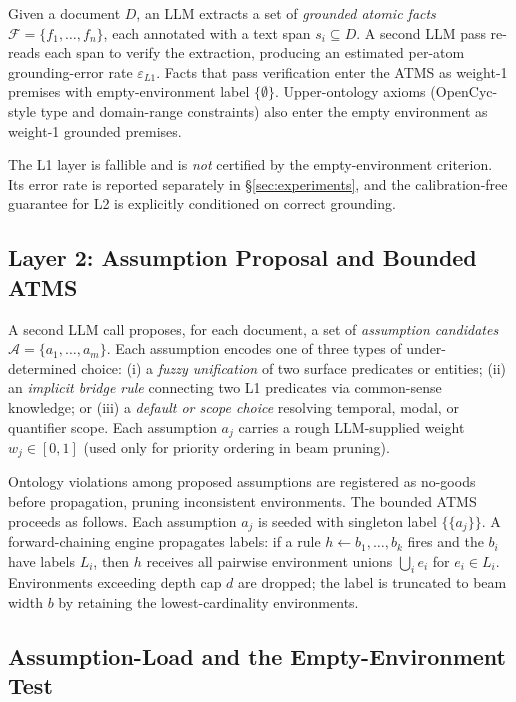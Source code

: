 \documentclass[11pt,letterpaper]{article}
\begin{document}
Given a document $D$, an LLM extracts a set of \emph{grounded atomic facts} $\mathcal{F} = \{f_1,
\ldots, f_n\}$, each annotated with a text span $s_i \subseteq D$. A second LLM pass re-reads each
span to verify the extraction, producing an estimated per-atom grounding-error rate $\varepsilon_{L1}$.
Facts that pass verification enter the ATMS as weight-1 premises with empty-environment label
$\{\emptyset\}$. Upper-ontology axioms (OpenCyc-style type and domain-range constraints) also enter the
empty environment as weight-1 grounded premises.

The L1 layer is fallible and is \emph{not} certified by the empty-environment criterion. Its error rate
is reported separately in \S\ref{sec:experiments}, and the calibration-free guarantee for L2 is
explicitly conditioned on correct grounding.

\subsection{Layer 2: Assumption Proposal and Bounded ATMS}

A second LLM call proposes, for each document, a set of \emph{assumption candidates} $\mathcal{A} =
\{a_1, \ldots, a_m\}$. Each assumption encodes one of three types of under-determined choice: (i) a
\emph{fuzzy unification} of two surface predicates or entities; (ii) an \emph{implicit bridge rule}
connecting two L1 predicates via common-sense knowledge; or (iii) a \emph{default or scope choice}
resolving temporal, modal, or quantifier scope. Each assumption $a_j$ carries a rough LLM-supplied
weight $w_j \in [0,1]$ (used only for priority ordering in beam pruning).

Ontology violations among proposed assumptions are registered as no-goods before propagation, pruning
inconsistent environments. The bounded ATMS proceeds as follows. Each assumption $a_j$ is seeded with
singleton label $\{\{a_j\}\}$. A forward-chaining engine propagates labels: if a rule $h \leftarrow
b_1, \ldots, b_k$ fires and the $b_i$ have labels $L_i$, then $h$ receives all pairwise environment
unions $\bigcup_i e_i$ for $e_i \in L_i$. Environments exceeding depth cap $d$ are dropped; the label
is truncated to beam width $b$ by retaining the lowest-cardinality environments.

\subsection{Assumption-Load and the Empty-Environment Test}
\end{document}
